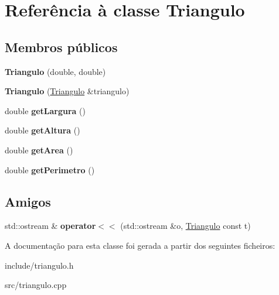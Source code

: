 \hypertarget{classTriangulo}{\section{Referência à classe Triangulo}
\label{classTriangulo}
}
\subsection*{Membros públicos}
\begin{DoxyCompactItemize}
\item 
\hypertarget{classTriangulo_acad1fd0b7da9b7de80cc1d5d93220f30}{{\bfseries Triangulo} (double, double)}\label{classTriangulo_acad1fd0b7da9b7de80cc1d5d93220f30}

\item 
\hypertarget{classTriangulo_a93d5bad19e9b040be465e7a179498192}{{\bfseries Triangulo} (\hyperlink{classTriangulo}{Triangulo} \&triangulo)}\label{classTriangulo_a93d5bad19e9b040be465e7a179498192}

\item 
\hypertarget{classTriangulo_a3377ac9bd0e6c2a4b19084848c6d19d3}{double {\bfseries get\-Largura} ()}\label{classTriangulo_a3377ac9bd0e6c2a4b19084848c6d19d3}

\item 
\hypertarget{classTriangulo_a15b4af28bd7904411bec90e959dd0473}{double {\bfseries get\-Altura} ()}\label{classTriangulo_a15b4af28bd7904411bec90e959dd0473}

\item 
\hypertarget{classTriangulo_a77b6125c397a67223f6094af4aa7637b}{double {\bfseries get\-Area} ()}\label{classTriangulo_a77b6125c397a67223f6094af4aa7637b}

\item 
\hypertarget{classTriangulo_af3b388ab66b32ccd54c9bae755815808}{double {\bfseries get\-Perimetro} ()}\label{classTriangulo_af3b388ab66b32ccd54c9bae755815808}

\end{DoxyCompactItemize}
\subsection*{Amigos}
\begin{DoxyCompactItemize}
\item 
\hypertarget{classTriangulo_a984af8ef1ff8f0646867bcea1f50db2c}{std\-::ostream \& {\bfseries operator$<$$<$} (std\-::ostream \&o, \hyperlink{classTriangulo}{Triangulo} const t)}\label{classTriangulo_a984af8ef1ff8f0646867bcea1f50db2c}

\end{DoxyCompactItemize}


A documentação para esta classe foi gerada a partir dos seguintes ficheiros\-:\begin{DoxyCompactItemize}
\item 
include/triangulo.\-h\item 
src/triangulo.\-cpp\end{DoxyCompactItemize}
